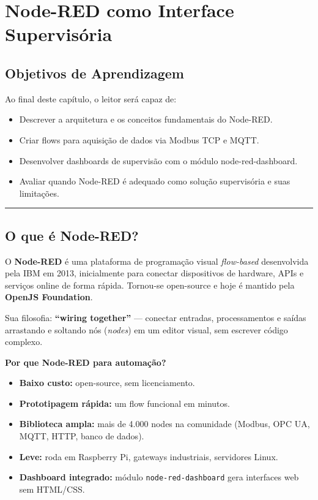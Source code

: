 \chapter{Node-RED como Interface Supervisória}\label{node-red-como-interface-supervisuxf3ria}

\section*{Objetivos de Aprendizagem}

Ao final deste capítulo, o leitor será capaz de:

\begin{itemize}
\tightlist
\item
  Descrever a arquitetura e os conceitos fundamentais do Node-RED.
\item
  Criar flows para aquisição de dados via Modbus TCP e MQTT.
\item
  Desenvolver dashboards de supervisão com o módulo node-red-dashboard.
\item
  Avaliar quando Node-RED é adequado como solução supervisória e suas limitações.
\end{itemize}

\begin{center}\rule{0.5\linewidth}{0.5pt}\end{center}

\section{O que é Node-RED?}\label{o-que-uxe9-node-red}

O \textbf{Node-RED} é uma plataforma de programação visual \emph{flow-based} desenvolvida pela IBM em 2013, inicialmente para conectar dispositivos de hardware, APIs e serviços online de forma rápida. Tornou-se open-source e hoje é mantido pela \textbf{OpenJS Foundation}.

Sua filosofia: \textbf{``wiring together''} --- conectar entradas, processamentos e saídas arrastando e soltando nós (\emph{nodes}) em um editor visual, sem escrever código complexo.

\textbf{Por que Node-RED para automação?}

\begin{itemize}
\tightlist
\item
  \textbf{Baixo custo:} open-source, sem licenciamento.
\item
  \textbf{Prototipagem rápida:} um flow funcional em minutos.
\item
  \textbf{Biblioteca ampla:} mais de 4.000 nodes na comunidade (Modbus, OPC UA, MQTT, HTTP, banco de dados).
\item
  \textbf{Leve:} roda em Raspberry Pi, gateways industriais, servidores Linux.
\item
  \textbf{Dashboard integrado:} módulo \passthrough{\lstinline!node-red-dashboard!} gera interfaces web sem HTML/CSS.
\end{itemize}

